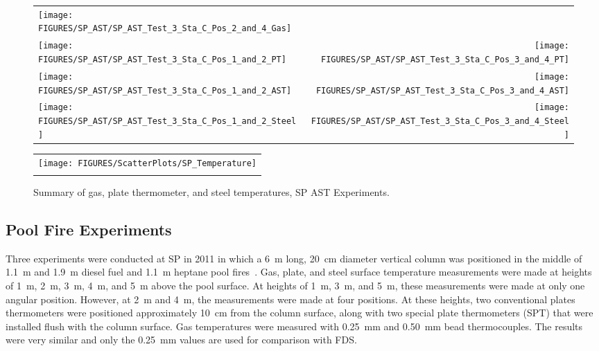 \begin{figure}[p]
\begin{tabular*}{\textwidth}{l@{\extracolsep{\fill}}r}
\texttt{[image: FIGURES/SP\_AST/SP\_AST\_Test\_3\_Sta\_C\_Pos\_2\_and\_4\_Gas]} &
  \\
\texttt{[image: FIGURES/SP\_AST/SP\_AST\_Test\_3\_Sta\_C\_Pos\_1\_and\_2\_PT]} &
\texttt{[image: FIGURES/SP\_AST/SP\_AST\_Test\_3\_Sta\_C\_Pos\_3\_and\_4\_PT]} \\
\texttt{[image: FIGURES/SP\_AST/SP\_AST\_Test\_3\_Sta\_C\_Pos\_1\_and\_2\_AST]} &
\texttt{[image: FIGURES/SP\_AST/SP\_AST\_Test\_3\_Sta\_C\_Pos\_3\_and\_4\_AST]} \\
\texttt{[image: FIGURES/SP\_AST/SP\_AST\_Test\_3\_Sta\_C\_Pos\_1\_and\_2\_Steel]} &
\texttt{[image: FIGURES/SP\_AST/SP\_AST\_Test\_3\_Sta\_C\_Pos\_3\_and\_4\_Steel]}
\end{tabular*}
\label{SP_Test_3_Station_C}
\end{figure}





\begin{figure}[p]
\begin{center}
\begin{tabular}{c}
\texttt{[image: FIGURES/ScatterPlots/SP\_Temperature]} \\
\vspace{0.25in}
\end{tabular}
\end{center}
\caption[Summary of gas, plate thermometer, and steel temperatures, SP AST Experiments.]
{Summary of gas, plate thermometer, and steel temperatures, SP AST Experiments.}
\end{figure}

\clearpage

\subsection{Pool Fire Experiments}

Three experiments were conducted at SP in 2011 in which a 6~m long, 20~cm diameter vertical column was positioned in the middle of 1.1~m and 1.9~m diesel fuel and 1.1~m heptane
pool fires~\cite{Sjostrom:AST}. Gas, plate, and steel surface temperature measurements were made at heights of 1~m, 2~m, 3~m, 4~m, and 5~m above the pool surface. At heights of 1~m, 3~m, and 5~m, these
measurements were made at only one angular position. However, at 2~m and 4~m, the measurements were made at four positions. At these heights, two conventional plates thermometers were positioned approximately 10~cm from the column surface, along
with two special plate thermometers (SPT) that were installed flush with the column surface. Gas temperatures were measured with 0.25~mm and 0.50~mm bead thermocouples. The results were very similar and only the 0.25~mm values are used for comparison with FDS.

